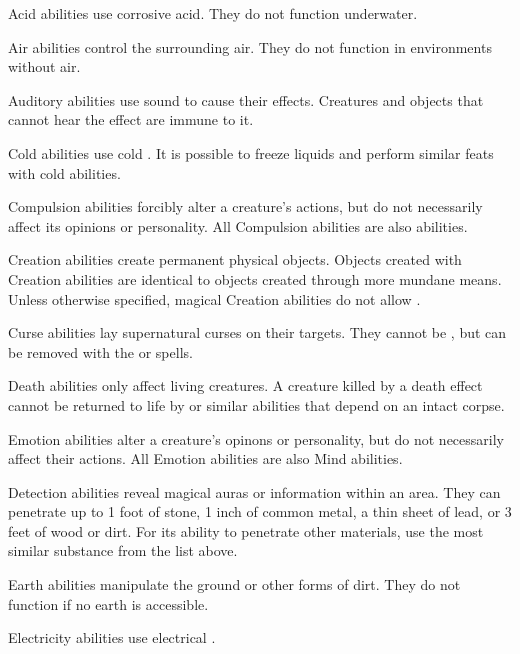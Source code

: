      Acid abilities use corrosive acid.
    They do not function underwater.

     Air abilities control the surrounding air.
    They do not function in environments without air.

     Auditory abilities use sound to cause their effects.
    Creatures and objects that cannot hear the effect are immune to it.

     Cold abilities use cold . It is possible to freeze liquids and perform similar feats with cold abilities.

     Compulsion abilities forcibly alter a creature's actions, but do not necessarily affect its opinions or personality.
    All Compulsion abilities are also  abilities.

     Creation abilities create permanent physical objects.
    Objects created with Creation abilities are identical to objects created through more mundane means.
    Unless otherwise specified, magical Creation abilities do not allow .

     Curse abilities lay supernatural curses on their targets.
    They cannot be , but can be removed with the  or  spells.

     Death abilities only affect living creatures.
    A creature killed by a death effect cannot be returned to life by  or similar abilities that depend on an intact corpse.

     Emotion abilities alter a creature's opinons or personality, but do not necessarily affect their actions.
    All Emotion abilities are also Mind abilities.

     Detection abilities reveal magical auras or information within an area.
    They can penetrate up to 1 foot of stone, 1 inch of common metal, a thin sheet of lead, or 3 feet of wood or dirt.
    For its ability to penetrate other materials, use the most similar substance from the list above.

     Earth abilities manipulate the ground or other forms of dirt.
    They do not function if no earth is accessible.

     Electricity abilities use electrical .

